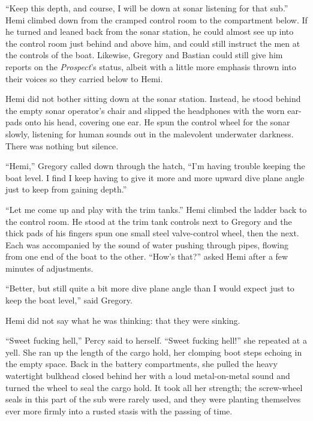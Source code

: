 \documentclass[
]{scrbook}
\begin{document}
\bigskip

``Keep this depth, and course, I will be down at sonar listening for
that sub.'' Hemi climbed down from the cramped control room to the
compartment below. If he turned and leaned back from the sonar station,
he could almost see up into the control room just behind and above him,
and could still instruct the men at the controls of the boat. Likewise,
Gregory and Bastian could still give him reports on the
\emph{Prospect}'s status, albeit with a little more emphasis thrown into
their voices so they carried below to Hemi.

Hemi did not bother sitting down at the sonar station. Instead, he stood
behind the empty sonar operator's chair and slipped the headphones with
the worn ear-pads onto his head, covering one ear. He spun the control
wheel for the sonar slowly, listening for human sounds out in the
malevolent underwater darkness. There was nothing but silence.

``Hemi,'' Gregory called down through the hatch, ``I'm having trouble
keeping the boat level. I find I keep having to give it more and more
upward dive plane angle just to keep from gaining depth.''

``Let me come up and play with the trim tanks.'' Hemi climbed the ladder
back to the control room. He stood at the trim tank controls next to
Gregory and the thick pads of his fingers spun one small steel
valve-control wheel, then the next. Each was accompanied by the sound of
water pushing through pipes, flowing from one end of the boat to the
other. ``How's that?'' asked Hemi after a few minutes of adjustments.

``Better, but still quite a bit more dive plane angle than I would
expect just to keep the boat level,'' said Gregory.

Hemi did not say what he was thinking: that they were sinking.

\bigskip

``Sweet fucking hell,'' Percy said to herself. ``Sweet fucking hell!''
she repeated at a yell. She ran up the length of the cargo hold, her
clomping boot steps echoing in the empty space. Back in the battery
compartments, she pulled the heavy watertight bulkhead closed behind her
with a loud metal-on-metal sound and turned the wheel to seal the cargo
hold. It took all her strength; the screw-wheel seals in this part of
the sub were rarely used, and they were planting themselves ever more
firmly into a rusted stasis with the passing of time.
\end{document}
